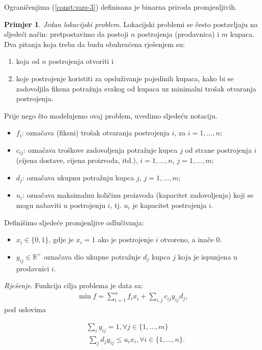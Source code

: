\documentclass[b5paper, utf8, 11pt, colorlinks]{book}
\theoremstyle{definition}
\newtheorem{primjer}{Primjer}[chapter]
\begin{document}
Ograničenjima (\ref{const:vars-3}) definisana je binarna priroda promjenljivih. 

\begin{primjer}
	\emph{Jedan lokacijski problem}. Lokacijski problemi se često postavljaju na sljedeći način: pretpostavimo da postoji $n$ postrojenja (prodavnica)  i  $m$ kupaca. Dva pitanja koja treba da budu obuhvaćena rješenjem su:
	\begin{enumerate}
		\item koja od $n$ postrojenja otvoriti i
		\item koje  postrojenje koristiti za opsluživanje pojedinih kupaca, kako bi se zadovoljila fiksna potražnja svakog od kupaca uz minimalni trošak otvaranja postrojenja.
	\end{enumerate}
	Prije nego što modelujemo ovaj problem, uvedimo sljedeću notaciju.
	\begin{itemize}
		\item  $f_{i}$: označava (fiksni) trošak otvaranja postrojenja $i$, za  $ i = 1,  \ldots, n$;
		\item $c_{ij}$: označava troškove zadovoljenja potražnje  kupca $j$ od strane postrojenja $i$ (cijena dostave, cijena proizvoda,  itd.), $i = 1, \ldots, n$, $j = 1,  \ldots, m$;
		\item $d_{j}$: označava ukupnu potražnju kupca $j$, $j = 1, \ldots, m$;
		\item $u_{i}$: označava maksimalnu količinu proizvoda (kapacitet zadovoljenja) koji se mogu nabaviti u postrojenju $i$, tj. $u_{i}$ je kapacitet postrojenja $i$.
	\end{itemize}
	Definišimo sljedeće promjenljive odlučivanja:
	
	\begin{itemize}
		\item $x_i \in \{0,1\}$, gdje je $x_i = 1$ ako je postrojenje $i$ otvoreno, a inače 0.
		\item $y_{ij} \in \mathbb{R}^+$  označava dio ukupne potražnje $d_j$ kupca $j$ koja je ispunjena u prodavnici $i$.  
	\end{itemize}
	
	\emph{Rješenje}. Funkcija cilja problema je data sa:
	\begin{align}
		\min f = \sum_{i=1}^n f_i x_i  + \sum_{i,j} c_{ij} y_{ij} d_j, \label{const:location-objective}
	\end{align}
	pod uslovima
	
	\begin{align}
		&\sum_{i} y_{ij} = 1, \forall j\in\{1,\ldots,m\}\label{const:location-1} \\
		&~\sum_{j} d_j y_{ij} \leq u_i x_i, \forall i \in \{1,\ldots,n\}\label{const:location-2}.
	\end{align}
	

\end{primjer}
\end{document}
